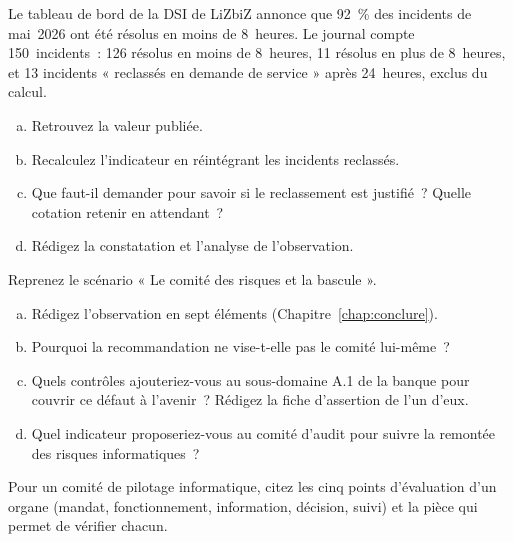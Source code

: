 \begin{boxexo}[title={\ding{45}\quad Exercice~17.2. Recalculer un délai de résolution \niveaumoyen}]
Le tableau de bord de la DSI de LiZbiZ annonce que 92~\% des incidents de
mai~2026 ont été résolus en moins de 8~heures. Le journal compte
150~incidents~: 126 résolus en moins de 8~heures, 11 résolus en plus de
8~heures, et 13 incidents « reclassés en demande de service » après
24~heures, exclus du calcul.
\begin{enumerate}[(a)]
    \item Retrouvez la valeur publiée.
    \item Recalculez l'indicateur en réintégrant les incidents reclassés.
    \item Que faut-il demander pour savoir si le reclassement est justifié~?
          Quelle cotation retenir en attendant~?
    \item Rédigez la constatation et l'analyse de l'observation.
\end{enumerate}
\end{boxexo}

\begin{boxexo}[title={\ding{45}\quad Exercice~17.3. Le comité des risques de la BANQUE SANAGA \niveauexpert}]
Reprenez le scénario « Le comité des risques et la bascule ».
\begin{enumerate}[(a)]
    \item Rédigez l'observation en sept éléments (Chapitre~\ref{chap:conclure}).
    \item Pourquoi la recommandation ne vise-t-elle pas le comité
          lui-même~?
    \item Quels contrôles ajouteriez-vous au sous-domaine A.1 de la banque
          pour couvrir ce défaut à l'avenir~? Rédigez la fiche d'assertion
          de l'un d'eux.
    \item Quel indicateur proposeriez-vous au comité d'audit pour suivre la
          remontée des risques informatiques~?
\end{enumerate}
\end{boxexo}

\bigskip

\begin{boxexo}[title={\ding{45}\quad Exercice~17.4. Les organes \niveaubase}]
Pour un comité de pilotage informatique, citez les cinq points
d'évaluation d'un organe (mandat, fonctionnement, information, décision,
suivi) et la pièce qui permet de vérifier chacun.
\end{boxexo}

